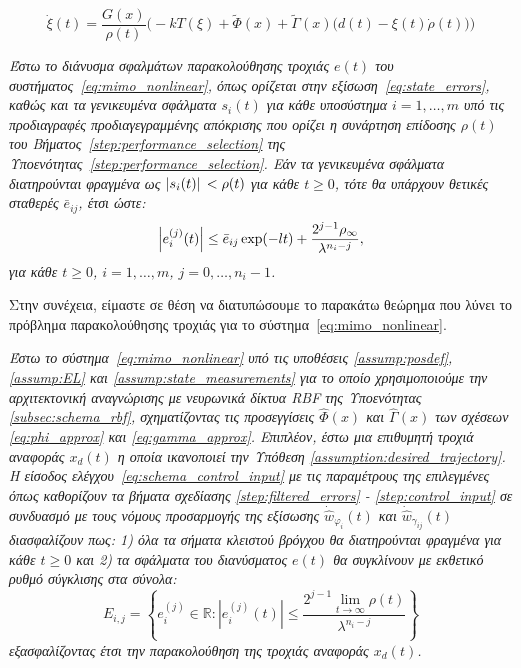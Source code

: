 \begin{equation}
	\dot{\xi}(t) = \frac{G(x)}{\rho(t)} \Big( -k T(\xi ) + \tilde{\Phi}(x) + \tilde{\Gamma}(x)\big( d(t) - \xi(t)\dot{\rho}(t) \big)  \Big)   
	\label{eq:xi_closed_loop}
\end{equation}


 \begin{lemma}{\cite{bechlioulis2013output}}
	\label{lemma:s_bound}
	\textit{Έστω το διάνυσμα σφαλμάτων παρακολούθησης τροχιάς $e(t)$ του συστήματος~\eqref{eq:mimo_nonlinear}, όπως ορίζεται στην εξίσωση~\eqref{eq:state_errors}, καθώς και τα γενικευμένα σφάλματα $s_i(t)$ για κάθε υποσύστημα $i = 1, \dots, m$ υπό τις προδιαγραφές προδιαγεγραμμένης απόκρισης που ορίζει η συνάρτηση επίδοσης $\rho(t)$ του Βήματος~\ref{step:performance_selection} της Υποενότητας~\ref{step:performance_selection}. Εάν τα γενικευμένα σφάλματα διατηρούνται φραγμένα ως $\abs*{s_i(t)} < \rho(t)$ για κάθε $t \geq 0$, τότε θα υπάρχουν θετικές σταθερές $\bar e_{ij}$, έτσι ώστε:
	\[
	\abs{e_i^{(j)}(t)} \leq \bar e_{ij} \exp(-l t) + \frac{2^{j-1} \rho_\infty}{{\lambda^{n_i - j}}},
	\]
	για κάθε $t \geq 0$, $i = 1,\ldots,m$, $j = 0,\ldots, n_i - 1$.}
\end{lemma}

Στην συνέχεια, είμαστε σε θέση να διατυπώσουμε το παρακάτω θεώρημα που λύνει το πρόβλημα παρακολούθησης τροχιάς για το σύστημα~\eqref{eq:mimo_nonlinear}.\\

\begin{theorem}
	\textit{Έστω το σύστημα~\eqref{eq:mimo_nonlinear} υπό τις υποθέσεις 
	\ref{assump:posdef}, \ref{assump:EL} και \ref{assump:state_measurements} για το οποίο χρησιμοποιούμε την αρχιτεκτονική αναγνώρισης με νευρωνικά δίκτυα RBF της Υποενότητας \ref{subsec:schema_rbf}, σχηματίζοντας τις προσεγγίσεις $\hat{\Phi}(x)$ και $\hat{\Gamma}(x)$ των σχέσεων \eqref{eq:phi_approx} και \eqref{eq:gamma_approx}. Επιπλέον, έστω μια επιθυμητή τροχιά αναφοράς $x_d(t)$ η οποία ικανοποιεί την Υπόθεση \ref{assumption:desired_trajectory}. Η είσοδος ελέγχου~\eqref{eq:schema_control_input} με τις παραμέτρους της επιλεγμένες όπως καθορίζουν τα βήματα σχεδίασης \ref{step:filtered_errors} - \ref{step:control_input} σε συνδυασμό με τους νόμους προσαρμογής της εξίσωσης $\dot{\hat{w}}_{\varphi_i}(t)$ και $\dot{\hat{w}}_{\gamma_{ij}}(t)$ διασφαλίζουν πως: 1) όλα τα σήματα κλειστού βρόγχου θα διατηρούνται φραγμένα για κάθε $t \geq 0$ και 2) τα σφάλματα του διανύσματος $e(t)$ θα συγκλίνουν με εκθετικό ρυθμό σύγκλισης στα σύνολα:
	\begin{equation}
	E_{i,j} = \left\{ e_i^{(j)} \in \mathbb{R} :
	| e_i^{(j)}(t) | \leq
	\frac{ 2^{j-1} \lim\limits_{t \rightarrow \infty}\rho(t)}{\lambda^{n_i - j}} \right\}
	\label{eq:final_state_error_sets}
	\end{equation}
	εξασφαλίζοντας έτσι την παρακολούθηση της τροχιάς αναφοράς $x_d(t)$.}
	\label{thrm:trajectory_tracking}
\end{theorem}


